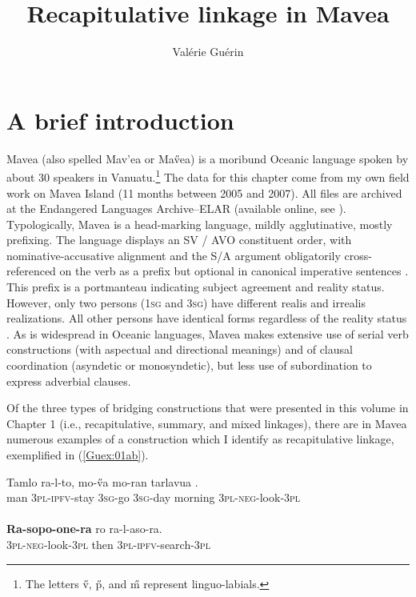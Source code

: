 \documentclass[output=paper]{LSP/langsci}
\author{
   Valérie Guérin\affiliation{Language and Culture Resource Center, James Cook University}
}
\title{Recapitulative linkage in Mavea}
\begin{document}
\section{A brief introduction} 
\label{Gusec:Introduction}
Mavea (also spelled Mav'ea or Ma\H{v}ea) is a moribund Oceanic language spoken by about 30 speakers in Vanuatu.\footnote{The letters \H{v}, \H{p}, and \H{m} represent linguo-labials.} The data for this chapter come from my own field work on Mavea Island (11 months between 2005 and 2007). All files are archived at the Endangered Languages Archive--ELAR (available online, see \citealt{guerin06}). Typologically, Mavea is a head-marking language, mildly agglutinative, mostly prefixing. The language displays an SV / AVO constituent order, with nominative-accusative alignment and the S/A argument obligatorily cross-referenced on the verb as a prefix but optional in canonical imperative sentences \citep[][236]{guerin11}. This prefix is a portmanteau indicating subject agreement and reality status. However, only two persons (\textsc{1sg} and \textsc{3sg}) have different realis and irrealis realizations. All other persons have identical forms regardless of the reality status \citep[][61]{guerin11}. As is widespread in Oceanic languages, Mavea makes extensive use of serial verb constructions (with aspectual and directional meanings) and of clausal coordination (asyndetic or monosyndetic), but less use of subordination to express adverbial clauses. 

Of the three types of bridging constructions that were presented in this volume in Chapter 1 (i.e., recapitulative, summary, and mixed linkages), there are in Mavea numerous examples of a construction which I identify as recapitulative linkage, exemplified in (\ref{Guex:01ab}). 


\begin{exe}
\ex \label{Guex:01ab}
\begin{xlist}
\ex \label{Guex:01a}
\gll Tamlo   ra-l-to,            mo-\H{v}a    mo-ran      tarlavua  \underline{}.\\
man     \textsc{3pl}-\textsc{ipfv}-stay   \textsc{3sg}-go     \textsc{3sg}-day   morning  \textsc{3pl-neg}-look-\textsc{3pl}\\
\glt {}\\
\ex \label{Guex:01b}
\gll \textbf{Ra-sopo-one-ra} ro      ra-l-aso-ra.\\     	       
    \textsc{3pl-neg}-look-\textsc{3pl}   then  \textsc{3pl-ipfv}-search-\textsc{3pl}\\
\glt {} 
\end{xlist}
\end{exe}
\end{document}

